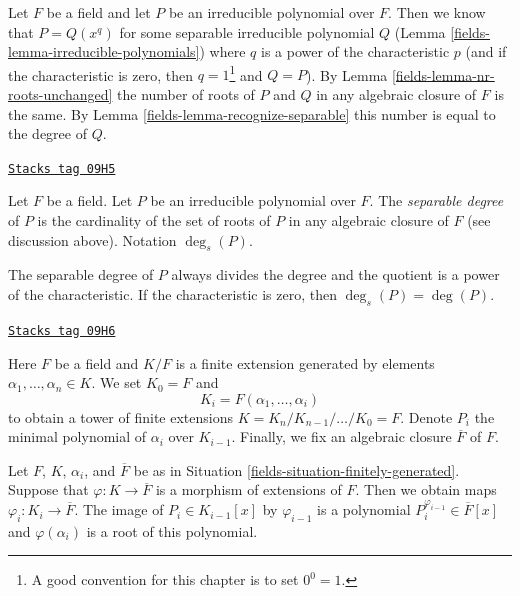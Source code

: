 Let $F$ be a field and let $P$ be an irreducible polynomial over $F$.
Then we know that $P = Q(x^q)$ for some separable irreducible polynomial $Q$
(Lemma \ref{fields-lemma-irreducible-polynomials}) where $q$ is a power of
the characteristic $p$ (and if the characteristic is zero, then
$q = 1$\footnote{A good convention for this chapter is to set $0^0 = 1$.}
and $Q = P$). By Lemma \ref{fields-lemma-nr-roots-unchanged} the number of
roots of $P$ and $Q$ in any algebraic closure of $F$ is the same.
By Lemma \ref{fields-lemma-recognize-separable} this number is equal to the degree
of $Q$.

\begin{definition}
\label{fields-definition-separable-degree}
\href{https://stacks.math.columbia.edu/tag/09H5}{\texttt{Stacks tag 09H5}}

Let $F$ be a field. Let $P$ be an irreducible polynomial over $F$.
The {\it separable degree} of $P$ is the cardinality of the
set of roots of $P$ in any algebraic closure of $F$ (see discussion
above). Notation $\deg_s(P)$.
\end{definition}

The separable degree of $P$ always divides the degree and the quotient
is a power of the characteristic. If the characteristic is zero, then
$\deg_s(P) = \deg(P)$.

\begin{definition}
\label{fields-situation-finitely-generated}
\href{https://stacks.math.columbia.edu/tag/09H6}{\texttt{Stacks tag 09H6}}

Here $F$ be a field and $K/F$ is a finite extension generated by elements
$\alpha_1, \ldots, \alpha_n \in K$. We set $K_0 = F$ and
$$
K_i = F(\alpha_1, \ldots, \alpha_i)
$$
to obtain a tower of finite extensions
$K = K_n / K_{n - 1} / \ldots / K_0 = F$.
Denote $P_i$ the minimal polynomial of $\alpha_i$ over $K_{i - 1}$.
Finally, we fix an algebraic closure $\overline{F}$ of $F$.
\end{definition}

Let $F$, $K$, $\alpha_i$, and $\overline{F}$ be as in
Situation \ref{fields-situation-finitely-generated}.
Suppose that $\varphi : K \to \overline{F}$ is a morphism of extensions
of $F$. Then we obtain maps $\varphi_i : K_i \to \overline{F}$.
The image of $P_i \in K_{i - 1}[x]$ by $\varphi_{i - 1}$
is a polynomial $P_i^{\varphi_{i - 1}} \in \overline{F}[x]$
and $\varphi(\alpha_i)$ is a root of this polynomial.

